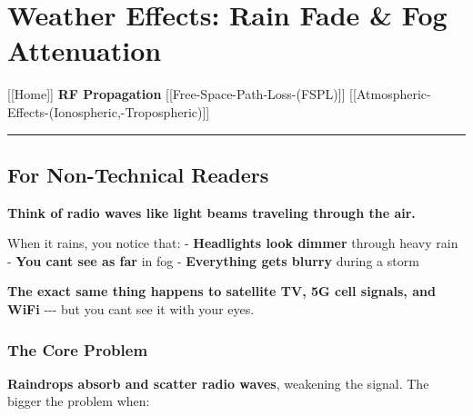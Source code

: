 \section{Weather Effects: Rain Fade \& Fog
Attenuation}\label{weather-effects-rain-fade-fog-attenuation}

{[}{[}Home{]}{]} \textbar{} \textbf{RF Propagation} \textbar{}
{[}{[}Free-Space-Path-Loss-(FSPL){]}{]} \textbar{}
{[}{[}Atmospheric-Effects-(Ionospheric,-Tropospheric){]}{]}

\begin{center}\rule{0.5\linewidth}{0.5pt}\end{center}

\subsection{For Non-Technical Readers}\label{for-non-technical-readers}

\textbf{Think of radio waves like light beams traveling through the
air.}

When it rains, you notice that: - \textbf{Headlights look dimmer}
through heavy rain - \textbf{You can\textquotesingle t see as far} in
fog - \textbf{Everything gets blurry} during a storm

\textbf{The exact same thing happens to satellite TV, 5G cell signals,
and WiFi} -\/-\/- but you can\textquotesingle t see it with your eyes.

\subsubsection{The Core Problem}\label{the-core-problem}

\textbf{Raindrops absorb and scatter radio waves}, weakening the signal.
The bigger the problem when:

